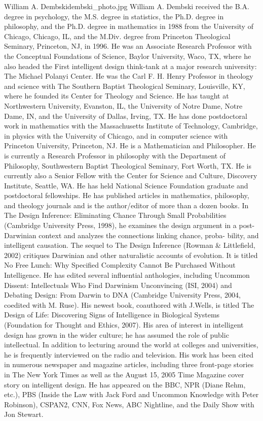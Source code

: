 \begin{authorbio}{William A. Dembski}{dembski_photo.jpg}
William A. Dembski received the B.A. degree in psychology, the M.S. degree in statistics, the
Ph.D. degree in philosophy, and the Ph.D. degree in mathematics in 1988 from the University of
Chicago, Chicago, IL, and the M.Div. degree from Princeton Theological Seminary, Princeton,
NJ, in 1996. He was an Associate Research Professor with the Conceptual Foundations of Science, 
Baylor University, Waco, TX, where he also headed the First intelligent design think-tank
at a major research university: The Michael Polanyi Center. He was the Carl F. H. Henry Professor 
in theology and science with The Southern Baptist Theological Seminary, Louisville, KY,
where he founded its Center for Theology and Science. He has taught at Northwestern University, 
Evanston, IL, the University of Notre Dame, Notre Dame, IN, and the University of Dallas,
Irving, TX. He has done postdoctoral work in mathematics with the Massachusetts Institute of
Technology, Cambridge, in physics with the University of Chicago, and in computer science with
Princeton University, Princeton, NJ. He is a Mathematician and Philosopher. He is currently a
Research Professor in philosophy with the Department of Philosophy, Southwestern Baptist Theological 
Seminary, Fort Worth, TX. He is currently also a Senior Fellow with the Center for Science
and Culture, Discovery Institute, Seattle, WA. He has held National Science Foundation graduate
and postdoctoral fellowships. He has published articles in mathematics, philosophy, and theology
journals and is the author/editor of more than a dozen books. In The Design Inference: Eliminating 
Chance Through Small Probabilities (Cambridge University Press, 1998), he examines the
design argument in a post-Darwinian context and analyzes the connections linking chance, proba-
bility, and intelligent causation. The sequel to The Design Inference (Rowman \& Littlefield, 2002)
critiques Darwinian and other naturalistic accounts of evolution. It is titled No Free Lunch: Why
Specified Complexity Cannot Be Purchased Without Intelligence. He has edited several influential
anthologies, including Uncommon Dissent: Intellectuals Who Find Darwinism Unconvincing (ISI,
2004) and Debating Design: From Darwin to DNA (Cambridge University Press, 2004, coedited
with M. Ruse). His newest book, coauthored with J.Wells, is titled The Design of Life: Discovering
Signs of Intelligence in Biological Systems (Foundation for Thought and Ethics, 2007). His area
of interest in intelligent design has grown in the wider culture; he has assumed the role of public
intellectual. In addition to lecturing around the world at colleges and universities, he is frequently
interviewed on the radio and television. His work has been cited in numerous newspaper and
magazine articles, including three front-page stories in The New York Times as well as the August
15, 2005 Time Magazine cover story on intelligent design. He has appeared on the BBC, NPR
(Diane Rehm, etc.), PBS (Inside the Law with Jack Ford and Uncommon Knowledge with Peter
Robinson), CSPAN2, CNN, Fox News, ABC Nightline, and the Daily Show with Jon Stewart.
\end{authorbio}

